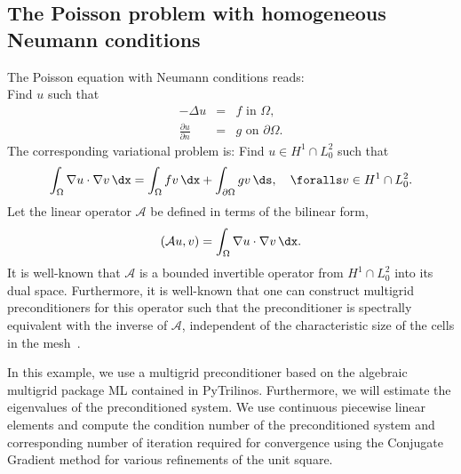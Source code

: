 \subsection{The Poisson problem with homogeneous Neumann conditions}
The Poisson equation with Neumann conditions reads: \\ 
Find $u$ such that
\begin{eqnarray}
-\Delta u &= &f \mbox{ in } \Omega,  \\ 
    \frac{\partial u}{\partial n} &=&  g \mbox{ on } \partial \Omega . 
\end{eqnarray}
The corresponding variational problem is:  Find $u\in H^1 \cap L^2_0$ such that 
\[
\int_\Omega \nabla u \cdot \nabla v \, \dx = \int_\Omega f v \, \dx +
\int_{\partial \Omega} g v \, \ds, \quad\foralls v \in H^1 \cap L^2_0 .      
\]
Let the linear operator $\mathcal{A}$ be defined in terms of the  bilinear form,  
\[
(\mathcal{A} u, v) =  \int_\Omega \nabla u \cdot \nabla v \, \dx.  
\]
It is well-known that 
$\mathcal{A}$ is a bounded invertible operator from $H^1 \cap L^2_0$ into its dual space. 
Furthermore, it is well-known that one can construct multigrid preconditioners for this operator
such that the preconditioner is spectrally equivalent with the inverse of $\mathcal{A}$, independent of the
characteristic size of the cells in the
mesh~\citep{Bramble1993,Hackbusch1994,TrottenbergOosterleeSchuller2001}. 

In this example, we use a multigrid preconditioner based on the algebraic multigrid
package ML contained in PyTrilinos. Furthermore, we will estimate the eigenvalues
of the preconditioned system. We use continuous piecewise linear elements and
compute the condition number of the preconditioned system and corresponding 
number of iteration required for convergence using the Conjugate Gradient method for various refinements of the unit square. 


